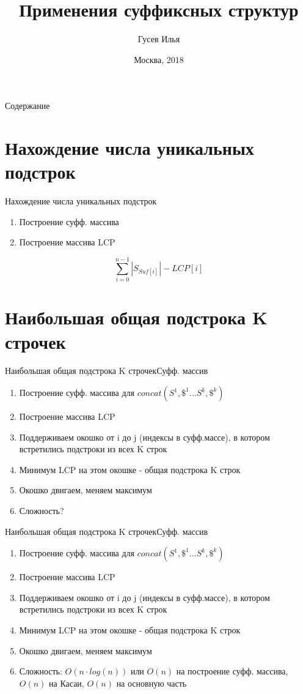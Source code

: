\documentclass[10pt]{beamer}
\title[\href{https://goo.gl/NRgp8K}{https://goo.gl/NRgp8K} (Term 3)]{Применения суффиксных структур}
\author[Гусев Илья]{Гусев Илья}
\institute[МФТИ] 
{Московский физико-технический институт\\*}
\date{Москва, 2018}
\begin{document}
\begin{frame}
  \titlepage
\end{frame}

\begin{frame}{Содержание}
\tableofcontents
\end{frame}

\section{Нахождение числа уникальных подстрок}
\begin{frame}[fragile]{Нахождение числа уникальных подстрок}
\begin{enumerate}
    \item Построение суфф. массива
    \item Построение массива LCP
\end{enumerate}
$$\sum_{i=0}^{n-1} |S_{Suf[i]}| - LCP[i]$$
\end{frame}

\section{Наибольшая общая подстрока K строчек}
\begin{frame}[fragile]{Наибольшая общая подстрока K строчек}{Суфф. массив}
\begin{enumerate}
    \item Построение суфф. массива для $concat(S^1, \$^1 \dots S^k, \$^k)$
    \item Построение массива LCP
    \item Поддерживаем окошко от i до j (индексы в суфф.массе), в котором встретились подстроки из всех K строк
    \item Минимум LCP на этом окошке - общая подстрока K строк
    \item Окошко двигаем, меняем максимум
    \item Сложность?
\end{enumerate}
\end{frame}

\begin{frame}[fragile]{Наибольшая общая подстрока K строчек}{Суфф. массив}
\begin{enumerate}
    \item Построение суфф. массива для $concat(S^1, \$^1 \dots S^k, \$^k)$
    \item Построение массива LCP
    \item Поддерживаем окошко от i до j (индексы в суфф.массе), в котором встретились подстроки из всех K строк
    \item Минимум LCP на этом окошке - общая подстрока K строк
    \item Окошко двигаем, меняем максимум
    \item Сложность: $O(n \cdot log(n))$ или $O(n)$ на построение суфф. массива, $O(n)$ на Касаи, $O(n)$ на основную часть
\end{enumerate}
\end{frame}
\end{document}
